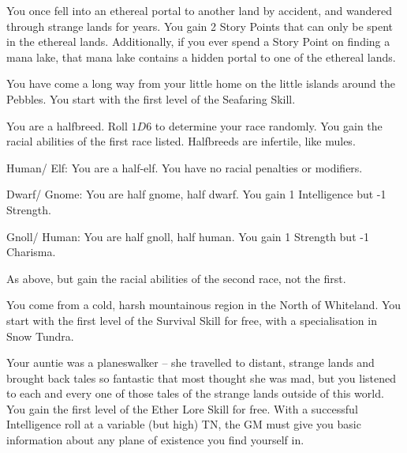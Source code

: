 \begin{list}{\addtocounter{list}{1}\textbf{:}}{\raggedleft}
	\item{You once fell into an ethereal portal to another land by accident, and wandered through strange lands for years.  You gain 2 Story Points that can only be spent in the ethereal lands.  Additionally, if you ever spend a Story Point on finding a mana lake, that mana lake contains a hidden portal to one of the ethereal lands.}

	\item{You have come a long way from your little home on the little islands around the Pebbles.  You start with the first level of the Seafaring Skill.}

	\item{You are a halfbreed.  Roll $1D6$ to determine your race randomly.  You gain the racial abilities of the first race listed.  Halfbreeds are infertile, like mules.}

		\setcounter{enc}{1}
		\begin{list}{\addtocounter{enc}{1}-\addtocounter{enc}{1}:}{}
			\item{Human/ Elf: You are a half-elf.  You have no racial penalties or modifiers.}

			\item{Dwarf/ Gnome: You are half gnome, half dwarf.  You gain 1 Intelligence but -1 Strength.}

			\item{Gnoll/ Human: You are half gnoll, half human.  You gain 1 Strength but -1 Charisma.}
		\end{list}

\item{As above, but gain the racial abilities of the second race, not the first.}

\item{You come from a cold, harsh mountainous region in the North of Whiteland.  You start with the first level of the Survival Skill for free, with a specialisation in Snow Tundra.}

\item{Your auntie was a planeswalker -- she travelled to distant, strange lands and brought back tales so fantastic that most thought she was mad, but you listened to each and every one of those tales of the strange lands outside of this world.  You gain the first level of the Ether Lore Skill for free.  With a successful Intelligence roll at a variable (but high) TN, the GM must give you basic information about any plane of existence you find yourself in.}


\end{list}
